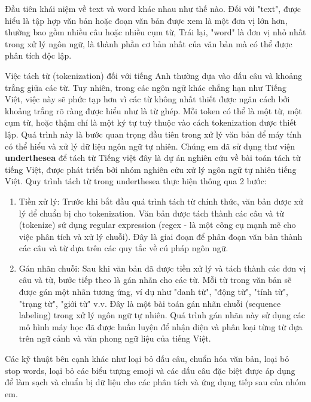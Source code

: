 Đầu tiên khái niệm về text và word khác nhau như thế nào. Đối với "text", được hiểu là tập hợp văn bản hoặc đoạn văn bản được xem là một đơn vị lớn hơn, thường bao gồm nhiều câu hoặc nhiều cụm từ, Trái lại, "word"  là đơn vị nhỏ nhất trong xử lý ngôn ngữ, là thành phần cơ bản nhất của văn bản mà có thể được phân tích độc lập. 

Việc tách từ (tokenization) đối với tiếng Anh thường dựa vào dấu câu và khoảng trắng giữa các từ. Tuy nhiên, trong các ngôn ngữ khác chẳng hạn như Tiếng Việt, việc này sẽ phức tạp hơn vì các từ không nhất thiết được ngăn cách bởi khoảng trắng rõ ràng được hiểu như là từ ghép. Mỗi token có thể là một từ, một cụm từ, hoặc thậm chí là một ký tự tuỳ thuộc vào cách tokenization được thiết lập. Quá trình này là bước quan trọng đầu tiên trong xử lý văn bản để máy tính có thể hiểu và xử lý dữ liệu ngôn ngữ tự nhiên. Chúng em đã sử dụng thư viện \textbf{underthesea} để tách từ Tiếng việt đây là dự án nghiên cứu về bài toán tách từ tiếng Việt, được phát triển bởi nhóm nghiên cứu xử lý ngôn ngữ tự nhiên tiếng Việt. Quy trình tách từ trong underthesea thực hiện thông qua 2 bước: 
\begin{enumerate}
    \item Tiền xử lý: Trước khi bắt đầu quá trình tách từ chính thức, văn bản được xử lý để chuẩn bị cho tokenization. Văn bản được tách thành các câu và từ (tokenize) sử dụng regular expression (regex - là một công cụ mạnh mẽ cho việc phân tích và xử lý chuỗi). Đây là giai đoạn để phân đoạn văn bản thành các câu và từ dựa trên các quy tắc về cú pháp ngôn ngữ.
    \item Gán nhãn chuỗi: Sau khi văn bản đã được tiền xử lý và tách thành các đơn vị câu và từ, bước tiếp theo là gán nhãn cho các từ. Mỗi từ trong văn bản sẽ được gán một nhãn tương ứng, ví dụ như "danh từ", "động từ", "tính từ", "trạng từ", "giới từ" v.v. Đây là một bài toán gán nhãn chuỗi (sequence labeling) trong xử lý ngôn ngữ tự nhiên. Quá trình gán nhãn này sử dụng các mô hình máy học đã được huấn luyện để nhận diện và phân loại từng từ dựa trên ngữ cảnh và văn phong ngữ liệu của tiếng Việt.
\end{enumerate}

Các kỹ thuật bên cạnh khác như loại bỏ dấu câu, chuẩn hóa văn bản, loại bỏ stop words, loại bỏ các biểu tượng emoji và các dấu câu đặc biệt được áp dụng để làm sạch và chuẩn bị dữ liệu cho các phân tích và ứng dụng tiếp sau của nhóm em.
